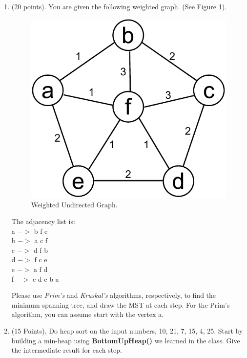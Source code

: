 \documentclass{article}
\begin{document}
\begin{enumerate}
\item (20 points). You are given the following weighted
  graph. (See Figure \ref{fig:weighted_undirected}).\\

\begin{figure}[H]
  \vspace{-10pt}
  \begin{center}
    \includegraphics[scale=0.5]{weighted-graph}
    \caption{Weighted Undirected Graph. \label{fig:weighted_undirected}}
  \end{center}
  \vspace{-20pt}
\end{figure}

The adjacency list is: \\
a $->$ b f e\\
b $->$ a c f\\
c $->$ d f b\\
d $->$ f c e\\
e $->$ a f d\\
f $->$ e d c b a

Please use {\it Prim's} and {\it Kruskal's} algorithms, respectively,
to find the minimum spanning tree, and draw the MST at each step. For
the Prim's algorithm, you can assume start with the vertex a. 

\item (15 Points). Do heap sort on the input numbers, 10, 21, 7, 15,
  4, 25. Start by building a min-heap using \textbf{BottomUpHeap()} we
  learned in the class. Give the intermediate result for each step.  


\end{enumerate}
\end{document}
